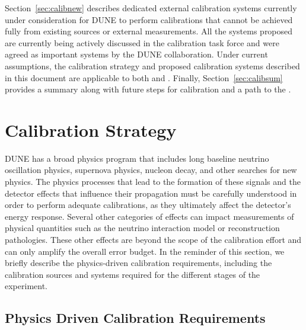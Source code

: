 Section~\ref{sec:calibnew} describes dedicated external calibration systems currently under consideration for DUNE to perform calibrations that cannot be achieved fully from existing sources or external measurements. All the systems proposed are currently being actively discussed in the calibration task force and were agreed as important systems by the DUNE collaboration. Under current assumptions, the calibration strategy and proposed calibration systems described in this document are applicable to both  and . %
Finally, Section~\ref{sec:calibsum} provides a summary along with future steps for calibration and a path to the . 

\section{Calibration Strategy}
\label{sec:calibstrat} %
DUNE has a broad physics program that includes long baseline neutrino oscillation physics, supernova physics, nucleon decay, and other searches for new physics. The physics processes that lead to the formation of these signals and the detector effects that influence their propagation must be carefully understood in order to perform adequate calibrations, as they ultimately affect the detector's energy response. Several other categories of effects can impact measurements of physical quantities such as the neutrino interaction model or reconstruction pathologies. %
These other effects are beyond the scope of the  calibration effort and can only amplify the overall error budget.
In the reminder of this section, we briefly describe the physics-driven calibration requirements, including the calibration sources and systems required for the different stages of the experiment.

\subsection{Physics Driven Calibration Requirements}

